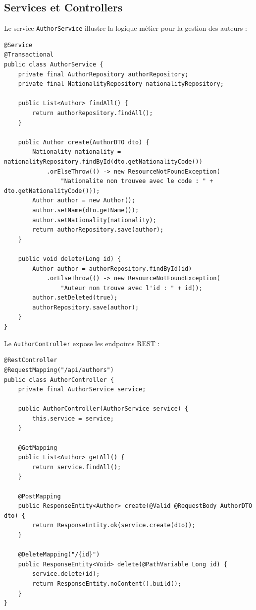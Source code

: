 \documentclass[12pt,a4paper,twoside]{report}
\begin{document}
\subsection{Services et Controllers}

Le service \texttt{AuthorService} illustre la logique métier pour la gestion des auteurs :

\begin{lstlisting}[caption=AuthorService (extrait)]
@Service
@Transactional
public class AuthorService {
    private final AuthorRepository authorRepository;
    private final NationalityRepository nationalityRepository;

    public List<Author> findAll() {
        return authorRepository.findAll();
    }

    public Author create(AuthorDTO dto) {
        Nationality nationality = nationalityRepository.findById(dto.getNationalityCode())
            .orElseThrow(() -> new ResourceNotFoundException(
                "Nationalite non trouvee avec le code : " + dto.getNationalityCode()));
        Author author = new Author();
        author.setName(dto.getName());
        author.setNationality(nationality);
        return authorRepository.save(author);
    }

    public void delete(Long id) {
        Author author = authorRepository.findById(id)
            .orElseThrow(() -> new ResourceNotFoundException(
                "Auteur non trouve avec l'id : " + id));
        author.setDeleted(true);
        authorRepository.save(author);
    }
}
\end{lstlisting}

Le \texttt{AuthorController} expose les endpoints REST :

\begin{lstlisting}[caption=AuthorController]
@RestController
@RequestMapping("/api/authors")
public class AuthorController {
    private final AuthorService service;

    public AuthorController(AuthorService service) {
        this.service = service;
    }

    @GetMapping
    public List<Author> getAll() {
        return service.findAll();
    }

    @PostMapping
    public ResponseEntity<Author> create(@Valid @RequestBody AuthorDTO dto) {
        return ResponseEntity.ok(service.create(dto));
    }

    @DeleteMapping("/{id}")
    public ResponseEntity<Void> delete(@PathVariable Long id) {
        service.delete(id);
        return ResponseEntity.noContent().build();
    }
}
\end{lstlisting}
\end{document}
